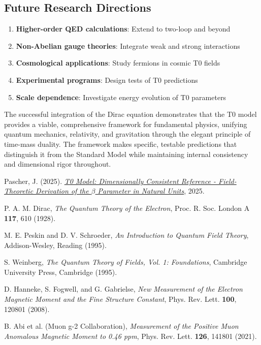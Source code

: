 \documentclass[12pt,a4paper]{article}
\begin{document}
	\subsection{Future Research Directions}
	\label{subsec:future_directions}
	
	\begin{enumerate}
		\item \textbf{Higher-order QED calculations}: Extend to two-loop and beyond
		\item \textbf{Non-Abelian gauge theories}: Integrate weak and strong interactions
		\item \textbf{Cosmological applications}: Study fermions in cosmic T0 fields
		\item \textbf{Experimental programs}: Design tests of T0 predictions
		\item \textbf{Scale dependence}: Investigate energy evolution of T0 parameters
	\end{enumerate}
	
	The successful integration of the Dirac equation demonstrates that the T0 model provides a viable, comprehensive framework for fundamental physics, unifying quantum mechanics, relativity, and gravitation through the elegant principle of time-mass duality. The framework makes specific, testable predictions that distinguish it from the Standard Model while maintaining internal consistency and dimensional rigor throughout.
	
	\begin{thebibliography}{9}
		Pascher, J. (2025). \href{https://github.com/jpascher/T0-Time-Mass-Duality/blob/main/2/pdf/DerivationVonBetaEn.pdf}{\textit{T0 Model: Dimensionally Consistent Reference - Field-Theoretic Derivation of the $\beta$ Parameter in Natural Units}}, 2025.
		
		P. A. M. Dirac,
		\textit{The Quantum Theory of the Electron},
		Proc. R. Soc. London A \textbf{117}, 610 (1928).
		
		M. E. Peskin and D. V. Schroeder,
		\textit{An Introduction to Quantum Field Theory},
		Addison-Wesley, Reading (1995).
		
		S. Weinberg,
		\textit{The Quantum Theory of Fields, Vol. 1: Foundations},
		Cambridge University Press, Cambridge (1995).
		
		D. Hanneke, S. Fogwell, and G. Gabrielse,
		\textit{New Measurement of the Electron Magnetic Moment and the Fine Structure Constant},
		Phys. Rev. Lett. \textbf{100}, 120801 (2008).
		
		B. Abi et al. (Muon g-2 Collaboration),
		\textit{Measurement of the Positive Muon Anomalous Magnetic Moment to 0.46 ppm},
		Phys. Rev. Lett. \textbf{126}, 141801 (2021).
	\end{thebibliography}
	
\end{document}

